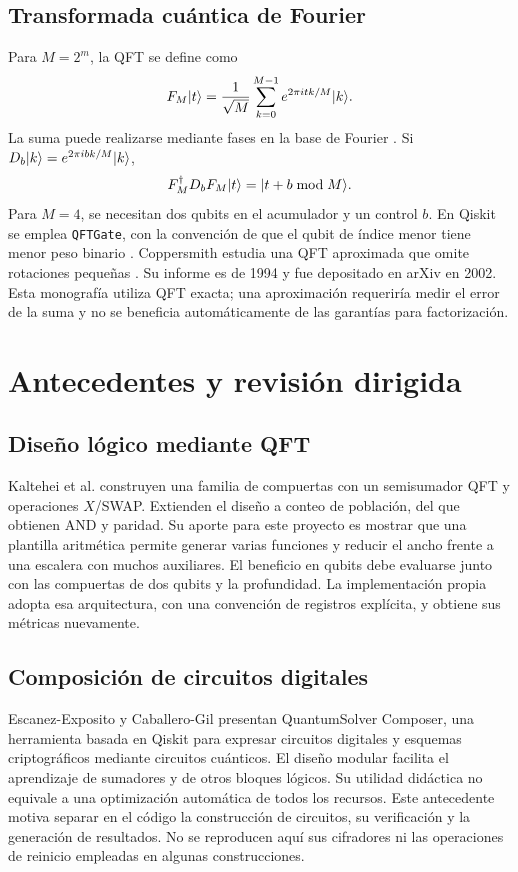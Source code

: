 \subsection{Transformada cuántica de Fourier}
Para $M=2^m$, la QFT se define como
\begin{equation}
F_M\lvert t\rangle=\frac{1}{\sqrt M}\sum_{k=0}^{M-1}
e^{2\pi i tk/M}\lvert k\rangle.
\end{equation}
La suma puede realizarse mediante fases en la base de Fourier
\cite{draper2000}. Si $D_b\lvert k\rangle=e^{2\pi i bk/M}\lvert k\rangle$,
\begin{equation}
F_M^\dagger D_bF_M\lvert t\rangle=\lvert t+b\bmod M\rangle.
\label{eq:add}
\end{equation}
Para $M=4$, se necesitan dos qubits en el acumulador y un control $b$.
En Qiskit se emplea \texttt{QFTGate}, con la convención de que el qubit
de índice menor tiene menor peso binario \cite{qftdocs}.
Coppersmith estudia una QFT aproximada que omite rotaciones pequeñas
\cite{coppersmith2002}. Su informe es de 1994 y fue depositado en arXiv en
2002. Esta monografía utiliza QFT exacta; una aproximación requeriría medir el
error de la suma y no se beneficia automáticamente de las garantías para
factorización.

\section{Antecedentes y revisión dirigida}
\subsection{Diseño lógico mediante QFT}
Kaltehei et al. \cite{kaltehei2026} construyen una familia de compuertas con
un semisumador QFT y operaciones $X$/SWAP. Extienden el diseño a conteo de
población, del que obtienen AND y paridad. Su aporte para este proyecto es
mostrar que una plantilla aritmética permite generar varias funciones y
reducir el ancho frente a una escalera con muchos auxiliares. El beneficio en
qubits debe evaluarse junto con las compuertas de dos qubits y la profundidad.
La implementación propia adopta esa arquitectura, con una convención de
registros explícita, y obtiene sus métricas nuevamente.

\subsection{Composición de circuitos digitales}
Escanez-Exposito y Caballero-Gil \cite{escanez2026} presentan QuantumSolver
Composer, una herramienta basada en Qiskit para expresar circuitos digitales
y esquemas criptográficos mediante circuitos cuánticos. El diseño modular
facilita el aprendizaje de sumadores y de otros bloques lógicos. Su utilidad
didáctica no equivale a una optimización automática de todos los recursos.
Este antecedente motiva separar en el código la construcción de circuitos,
su verificación y la generación de resultados. No se reproducen aquí sus
cifradores ni las operaciones de reinicio empleadas en algunas construcciones.

